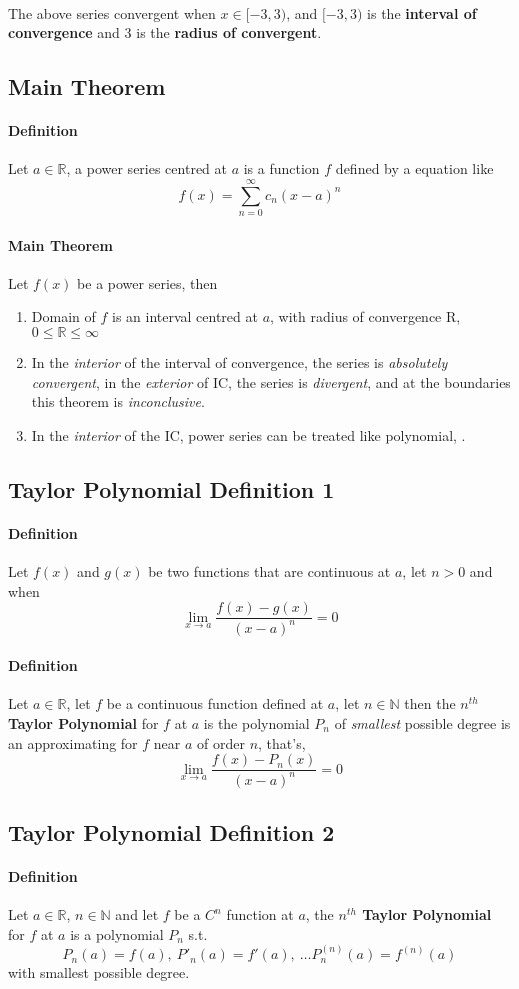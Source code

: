 \documentclass{article}
\newcommand{\R}[0]{\mathbb{R}}
\newcommand{\definition}[0]{\paragraph{Definition}}
\newcommand{\N}[0]{\mathbb{N}}
\newcommand{\series}[2]{\sum_{#1}^{\infty}{#2}}
\begin{document}
\paragraph{} The above series convergent when $x \in [-3,3)$, and $[-3,3)$ is the \textbf{interval of convergence} and $3$ is the \textbf{radius of convergent}.

\subsection{Main Theorem}
\definition Let $a \in \R$, a power series centred at $a$ is a function $f$ defined by a equation like 
\[
	f(x) = \series{n=0}{c_n(x-a)^n}
\]

\paragraph{Main Theorem} Let $f(x)$ be a power series, then
\begin{enumerate}
	\item Domain of $f$ is an interval centred at $a$, with radius of convergence R, $0\leq\R\leq\infty$
	\item In the \emph{interior} of the interval of convergence, the series is \emph{absolutely convergent}, in the \emph{exterior} of IC, the series is \emph{divergent}, and at the boundaries this theorem is \emph{inconclusive}.
	\item In the \emph{interior} of the IC, power series can be treated like polynomial, .
\end{enumerate}

\subsection{Taylor Polynomial Definition 1}
\definition Let $f(x)$ and $g(x)$ be two functions that are continuous at $a$, let $n>0$ and  when 
\[
	\lim_{x\to a}\frac{f(x) - g(x)}{(x-a)^n} = 0
\]

\definition Let $a \in \R$, let $f$ be a continuous function defined at $a$, let $n\in \N$ then the \textbf{$n^{th}$ Taylor Polynomial} for $f$ at $a$ is the polynomial $P_n$ of \emph{smallest} possible degree is an approximating for $f$ near $a$ of order $n$, that's,
\[
	\lim_{x\to a}\frac{f(x) - P_n(x)}{(x-a)^n} = 0
\]

\subsection{Taylor Polynomial Definition 2}
\definition Let $a \in \R$, $n \in \N$ and let $f$ be a $C^n$ function at $a$, the \textbf{$n^{th}$ Taylor Polynomial} for $f$ at $a$ is a polynomial $P_n$ s.t.
\[
	P_n(a)=f(a),\ P'_n(a)=f'(a),\ \dots P^{(n)}_n(a) = f^{(n)}(a)
\]
with smallest possible degree.
\end{document}
